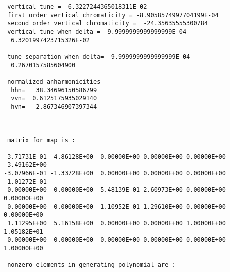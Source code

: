 {\begin{verbatim}
 vertical tune =  6.3227244365018311E-02
 first order vertical chromaticity = -8.9058574997704199E-04
 second order vertical chromaticity =  -24.35635555300784
 vertical tune when delta =  9.9999999999999999E-04
  6.3201997423715326E-02

 tune separation when delta=  9.9999999999999999E-04
  0.2670157585604900

 normalized anharmonicities
  hhn=   38.34696150586799
  vvn=  0.6125175935029140
  hvn=   2.867346907397344



 matrix for map is :

 3.71731E-01  4.86128E+00  0.00000E+00 0.00000E+00 0.00000E+00 -3.49162E+00
-3.07966E-01 -1.33728E+00  0.00000E+00 0.00000E+00 0.00000E+00 -1.01272E-01
 0.00000E+00  0.00000E+00  5.48139E-01 2.60973E+00 0.00000E+00  0.00000E+00
 0.00000E+00  0.00000E+00 -1.10952E-01 1.29610E+00 0.00000E+00  0.00000E+00
 1.11295E+00  5.16158E+00  0.00000E+00 0.00000E+00 1.00000E+00  1.05182E+01
 0.00000E+00  0.00000E+00  0.00000E+00 0.00000E+00 0.00000E+00  1.00000E+00

 nonzero elements in generating polynomial are :


\end{verbatim}}
